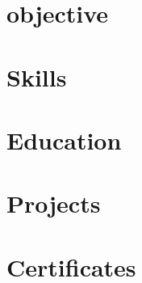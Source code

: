 \documentclass[a4paper,10pt]{article}
\begin{document}
% 

\section{objective}


\section{Skills}


\section{Education}


\section{Projects}






\section{Certificates}

\end{document}
